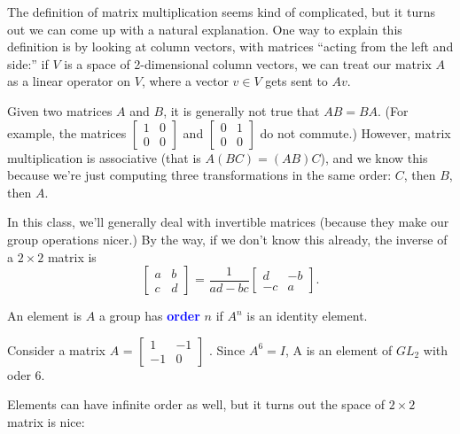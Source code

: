 \documentclass[11pt]{article}
\begin{document}
The definition of matrix multiplication seems kind of complicated, but it turns
out we can come up with a natural explanation. One way to explain this
definition is by looking at column vectors, with matrices ``acting from the
left and side:'' if $V$ is a space of 2-dimensional column vectors, we can
treat our matrix $A$ as a linear operator on $V$, where a vector $v \in V$ gets
sent to $Av$.
\begin{fact}
    Given two matrices $A$ and $B$, it is generally not true that $AB = BA$. (For example, the matrices $\begin{bmatrix}
            1 & 0 \\
            0 & 0
        \end{bmatrix}$
    and $\begin{bmatrix}
            0 & 1 \\
            0 & 0\end{bmatrix}$ do not commute.) However, matrix multiplication is associative (that is $A(BC) = (AB)C$), and we know this because we're just computing three transformations in the same order: $C$, then $B$, then $A$.
\end{fact}

In this class, we'll generally deal with invertible matrices (because they make
our group operations nicer.) By the way, if we don't know this already, the
inverse of a $2 \times 2$ matrix is
\[
    \begin{bmatrix}
        a & b \\
        c & d
    \end{bmatrix} \text{ = } \frac{1}{ad - bc} \begin{bmatrix}
        d  & -b \\
        -c & a
    \end{bmatrix}.
\]

\begin{definition}
    An element is $A$ a group has \textcolor{blue}{\textbf{order}} $n$ if $A^n$ is an identity element.
\end{definition}

\begin{example}
    Consider a matrix $A$ = $
        \begin{bmatrix}
            1  & -1 \\
            -1 & 0
        \end{bmatrix}$
    . Since $A^6 = I$, A is an element of $GL_2$ with oder 6.
\end{example}
Elements can have infinite order as well, but it turns out the space of $2 \times 2 $ matrix is nice:
\end{document}
